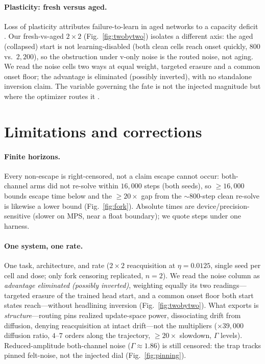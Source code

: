 \documentclass[10pt]{article}
\newcommand{\gam}{\Gamma}
\begin{document}
\paragraph{Plasticity: fresh versus aged.}
Loss of plasticity attributes failure-to-learn in aged networks to a capacity
deficit \citep{dohare}. Our fresh-vs-aged $2\times2$ (Fig.~\ref{fig:twobytwo})
isolates a different axis: the aged (collapsed) start is not learning-disabled
(both clean cells reach onset quickly, $800$ vs.\ $2{,}200$), so the obstruction
under v-only noise is the routed noise, not aging. We read the noise cells two
ways at equal weight, targeted erasure and a common onset floor; the advantage is
eliminated (possibly inverted), with no standalone inversion claim. The variable
governing the fate is not the injected magnitude but where the optimizer routes it
\citep{position}.


\section{Limitations and corrections}
\label{sec:limits}

\paragraph{Finite horizons.}
Every non-escape is right-censored, not a claim escape cannot occur: both-channel arms did not re-solve within $16{,}000$ steps (both seeds), so ${\geq}16{,}000$ bounds escape time below and the ${\geq}20\times$ gap from the ${\sim}800$-step clean re-solve is likewise a lower bound (Fig.~\ref{fig:fork}). Absolute times are device/precision-sensitive (slower on MPS, near a float boundary); we quote steps under one harness.

\paragraph{One system, one rate.}
One task, architecture, and rate ($2\times2$ reacquisition at $\eta=0.0125$, single seed per cell and dose; only fork censoring replicated, $n=2$). We read the noise column as \emph{advantage eliminated (possibly inverted)}, weighting equally its two readings---targeted erasure of the trained head start, and a common onset floor both start states reach---without headlining inversion (Fig.~\ref{fig:twobytwo}). What exports is \emph{structure}---routing pins realized update-space power, dissociating drift from diffusion, denying reacquisition at intact drift---not the multipliers ($\times39{,}000$ diffusion ratio, $4$--$7$ orders along the trajectory, ${\geq}20\times$ slowdown, $\gam$ levels). Reduced-amplitude both-channel noise ($\gam\approx1.86$) is still censored: the trap tracks pinned felt-noise, not the injected dial (Fig.~\ref{fig:pinning}).
\end{document}
